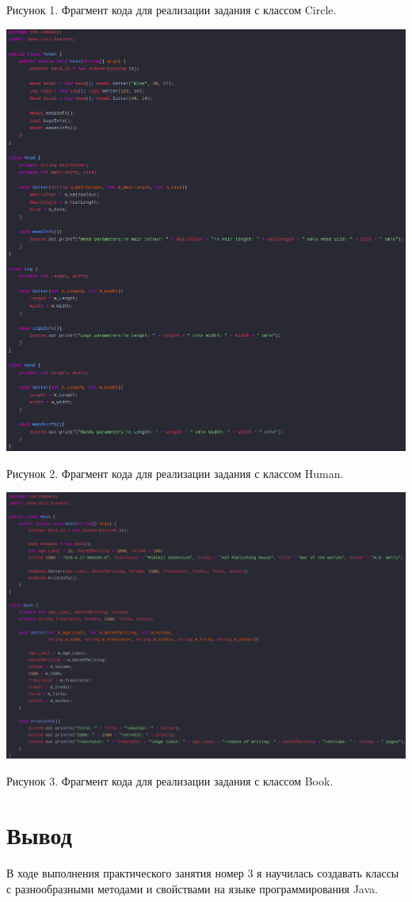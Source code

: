 \documentclass{article}
\begin{document}
\caption{Рисунок 1. Фрагмент кода для реализации задания с классом Circle.}

\includegraphics[width=1.2\linewidth]{view2.png}

\caption{Рисунок 2. Фрагмент кода для реализации задания с классом Human.}

\includegraphics[width=1\linewidth]{view3.png}

\caption{Рисунок 3. Фрагмент кода для реализации задания с классом Book.}

\section{Вывод}
В ходе выполнения практического занятия номер 3 я научилась создавать классы с разнообразными методами и свойствами на языке программирования Java.
\end{document}
